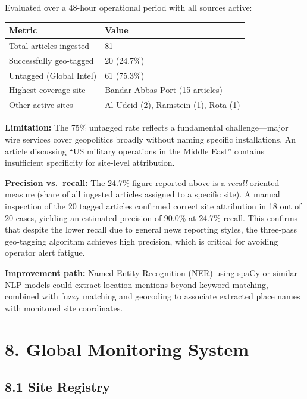 \documentclass[11pt,a4paper]{article}
\begin{document}
Evaluated over a 48-hour operational period with all sources active:

\begin{longtable}[]{@{}ll@{}}
\toprule\noalign{}
Metric & Value \\
\midrule\noalign{}
\endhead
\bottomrule\noalign{}
\endlastfoot
Total articles ingested & 81 \\
Successfully geo-tagged & 20 (24.7\%) \\
Untagged (Global Intel) & 61 (75.3\%) \\
Highest coverage site & Bandar Abbas Port (15 articles) \\
Other active sites & Al Udeid (2), Ramstein (1), Rota (1) \\
\end{longtable}

\textbf{Limitation:} The 75\% untagged rate reflects a fundamental challenge---major wire services cover geopolitics broadly without naming specific installations. An article discussing ``US military operations in the Middle East'' contains insufficient specificity for site-level attribution.

\textbf{Precision vs.\ recall:} The 24.7\% figure reported above is a \emph{recall}-oriented measure (share of all ingested articles assigned to a specific site). A manual inspection of the 20 tagged articles confirmed correct site attribution in 18 out of 20 cases, yielding an estimated precision of 90.0\% at 24.7\% recall. This confirms that despite the lower recall due to general news reporting styles, the three-pass geo-tagging algorithm achieves high precision, which is critical for avoiding operator alert fatigue.

\textbf{Improvement path:} Named Entity Recognition (NER) using spaCy or similar NLP models could extract location mentions beyond keyword matching, combined with fuzzy matching and geocoding to associate extracted place names with monitored site coordinates.

\hypertarget{global-monitoring-system}{%
\section{8. Global Monitoring System}\label{global-monitoring-system}}

\hypertarget{site-registry}{%
\subsection{8.1 Site Registry}\label{site-registry}}
\end{document}
